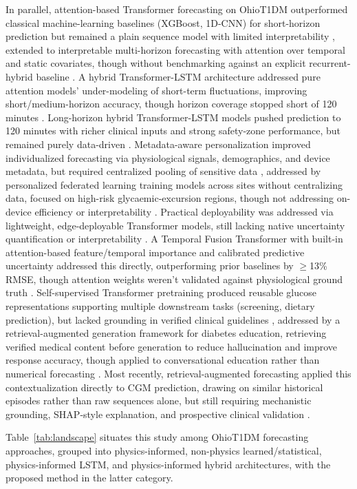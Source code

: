 \documentclass[journal]{IEEEtran}
\begin{document}
In parallel, attention-based Transformer forecasting on OhioT1DM outperformed classical machine-learning baselines (XGBoost, 1D-CNN) for short-horizon prediction but remained a plain sequence model with limited interpretability \cite{ref19}, extended to interpretable multi-horizon forecasting with attention over temporal and static covariates, though without benchmarking against an explicit recurrent-hybrid baseline \cite{ref20}. A hybrid Transformer-LSTM architecture addressed pure attention models' under-modeling of short-term fluctuations, improving short/medium-horizon accuracy, though horizon coverage stopped short of 120 minutes \cite{ref21}. Long-horizon hybrid Transformer-LSTM models pushed prediction to 120 minutes with richer clinical inputs and strong safety-zone performance, but remained purely data-driven \cite{ref22}. Metadata-aware personalization improved individualized forecasting via physiological signals, demographics, and device metadata, but required centralized pooling of sensitive data \cite{ref23}, addressed by personalized federated learning training models across sites without centralizing data, focused on high-risk glycaemic-excursion regions, though not addressing on-device efficiency or interpretability \cite{ref24}. Practical deployability was addressed via lightweight, edge-deployable Transformer models, still lacking native uncertainty quantification or interpretability \cite{ref25}. A Temporal Fusion Transformer with built-in attention-based feature/temporal importance and calibrated predictive uncertainty addressed this directly, outperforming prior baselines by $\geq$13\% RMSE, though attention weights weren't validated against physiological ground truth \cite{ref26}. Self-supervised Transformer pretraining produced reusable glucose representations supporting multiple downstream tasks (screening, dietary prediction), but lacked grounding in verified clinical guidelines \cite{ref27}, addressed by a retrieval-augmented generation framework for diabetes education, retrieving verified medical content before generation to reduce hallucination and improve response accuracy, though applied to conversational education rather than numerical forecasting \cite{ref28}. Most recently, retrieval-augmented forecasting applied this contextualization directly to CGM prediction, drawing on similar historical episodes rather than raw sequences alone, but still requiring mechanistic grounding, SHAP-style explanation, and prospective clinical validation \cite{ref29}.

Table~\ref{tab:landscape} situates this study among OhioT1DM forecasting approaches, grouped into physics-informed, non-physics learned/statistical, physics-informed LSTM, and physics-informed hybrid architectures, with the proposed method in the latter category.
\end{document}
